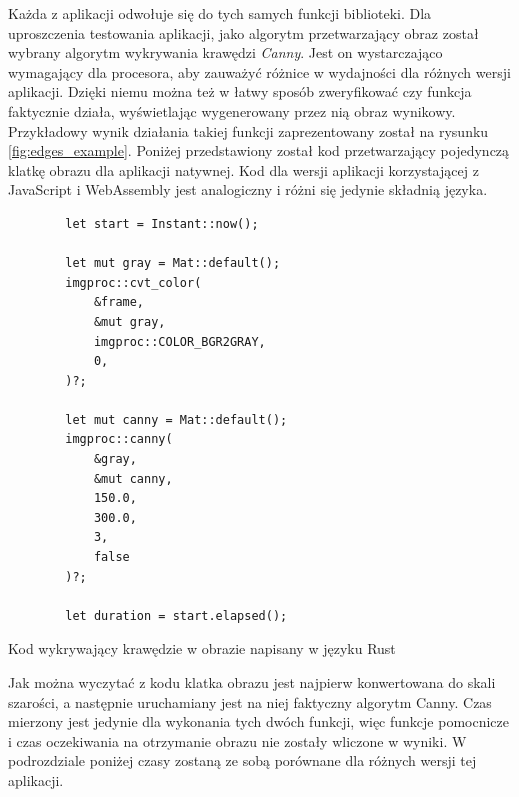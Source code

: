 \documentclass[language=polish,type=master]{aghmodern}
\begin{document}
Każda z aplikacji odwołuje się do tych samych funkcji biblioteki.
Dla uproszczenia testowania aplikacji, jako algorytm przetwarzający obraz został wybrany algorytm wykrywania krawędzi \emph{Canny}\footnotemark{}.
Jest on wystarczająco wymagający dla procesora, aby zauważyć różnice w wydajności dla różnych wersji aplikacji.
Dzięki niemu można też w łatwy sposób zweryfikować czy funkcja faktycznie działa, wyświetlając wygenerowany przez nią obraz wynikowy.
Przykładowy wynik działania takiej funkcji zaprezentowany został na rysunku \ref{fig:edges_example}.
Poniżej przedstawiony został kod przetwarzający pojedynczą klatkę obrazu dla aplikacji natywnej.
Kod dla wersji aplikacji korzystającej z JavaScript i WebAssembly jest analogiczny i różni się jedynie składnią języka.

\begin{listing}[H]
    \begin{verbatim}
        let start = Instant::now();

        let mut gray = Mat::default();
        imgproc::cvt_color(
            &frame,
            &mut gray,
            imgproc::COLOR_BGR2GRAY,
            0,
        )?;

        let mut canny = Mat::default();
        imgproc::canny(
            &gray,
            &mut canny,
            150.0,
            300.0,
            3,
            false
        )?;

        let duration = start.elapsed();
    \end{verbatim}
    \caption{Kod wykrywający krawędzie w obrazie napisany w języku Rust}
\end{listing}

Jak można wyczytać z kodu klatka obrazu jest najpierw konwertowana do skali szarości, a następnie uruchamiany jest na niej faktyczny algorytm Canny.
Czas mierzony jest jedynie dla wykonania tych dwóch funkcji, więc funkcje pomocnicze i czas oczekiwania na otrzymanie obrazu nie zostały wliczone w wyniki.
W podrozdziale poniżej czasy zostaną ze sobą porównane dla różnych wersji tej aplikacji.
\end{document}
